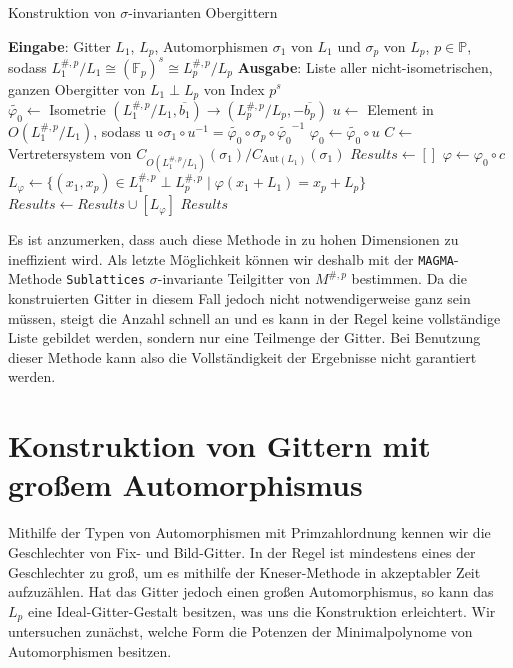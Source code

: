 \documentclass[12pt,a4paper,halfparskip,headsepline,bibtotocnumbered]{scrreprt}
\theoremstyle{nummermitklammern}
\theoremstyle{nonumberbreak}
\newcommand{\F}{\mathbb{F}}
\renewcommand{\P}{\mathbb{P}}
\begin{document}
\begin{algorithm}[H]
	\caption{Konstruktion von $\sigma$-invarianten Obergittern}\label{alg:superlat}
	\begin{algorithmic}[1]
		\State \textbf{Eingabe}: Gitter $L_1$, $L_p$, Automorphismen $\sigma_1$ von $L_1$ und $\sigma_p$ von $L_p$, $p \in \P$, sodass $L_1^{\#,p}/L_1 \cong (\F_p)^s \cong L_p^{\#,p}/L_p$
		\State \textbf{Ausgabe}: Liste aller nicht-isometrischen, ganzen Obergitter von $L_1 \perp L_p$ von Index $p^s$
		\\
		\State $\tilde{\varphi_0} \gets$ Isometrie $(L_1^{\#,p} / L_1, \overline{b_1}) \rightarrow (L_p^{\#,p} / L_p, -\overline{b_p})$
		\State $u \gets$ Element in $O(L_1^{\#,p}/L_1)$, sodass u $\circ \sigma_1 \circ u^{-1} = \tilde{\varphi_0} \circ \sigma_p \circ \tilde{\varphi_0}^{-1}$
		\State $\varphi_0 \gets \tilde{\varphi_0} \circ u$
		\State $C \gets$ Vertretersystem von $C_{O(L_1^{\#,p} / L_1)}(\sigma_1) / C_{\text{Aut}(L_1)}(\sigma_1)$
		\State $Results \gets []$
			\State $\varphi \gets \varphi_0 \circ c$
			\State $L_\varphi \gets \lbrace (x_1,x_p) \in L_1^{\#,p} \perp L_p^{\#,p} \mid \varphi(x_1+L_1) = x_p + L_p \rbrace$
				\State $Results \gets Results \cup [L_\varphi]$
			\EndIf
		\EndFor
		\State \Return $Results$
	\end{algorithmic}
\end{algorithm}
Es ist anzumerken, dass auch diese Methode in zu hohen Dimensionen zu ineffizient wird. Als letzte Möglichkeit können wir deshalb mit der \texttt{MAGMA}-Methode \texttt{Sublattices} $\sigma$-invariante Teilgitter von $M^{\#,p}$ bestimmen. Da die konstruierten Gitter in diesem Fall jedoch nicht notwendigerweise ganz sein müssen, steigt die Anzahl schnell an und es kann in der Regel keine vollständige Liste gebildet werden, sondern nur eine Teilmenge der Gitter. Bei Benutzung dieser Methode kann also die Vollständigkeit der Ergebnisse nicht garantiert werden.



\section{Konstruktion von Gittern mit großem Automorphismus}

Mithilfe der Typen von Automorphismen mit Primzahlordnung kennen wir die Geschlechter von Fix- und Bild-Gitter. In der Regel ist mindestens eines der Geschlechter zu groß, um es mithilfe der Kneser-Methode in akzeptabler Zeit aufzuzählen. Hat das Gitter jedoch einen großen Automorphismus, so kann das $L_p$ eine Ideal-Gitter-Gestalt besitzen, was uns die Konstruktion erleichtert. Wir untersuchen zunächst, welche Form die Potenzen der Minimalpolynome von Automorphismen besitzen.
\end{document}
